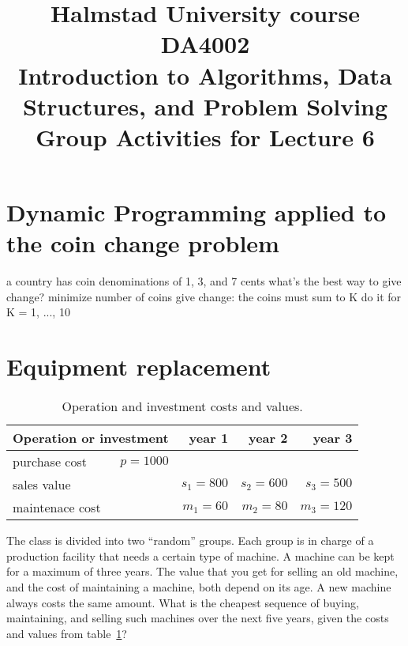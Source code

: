\documentclass[a4paper]{article}
\begin{document}
\title{
  {\small
    Halmstad University course DA4002\\
    Introduction to Algorithms, Data Structures, and Problem Solving\\
  }
  Group Activities for Lecture 6
}
\maketitle



\section{Dynamic Programming applied to the coin change problem}

a country has coin denominations of 1, 3, and 7 cents
what's the best way to give change?
minimize number of coins
give change: the coins must sum to K
do it for K = { 1, ..., 10 }



\section{Equipment replacement}

\begin{table}
  \caption{Operation and investment costs and values.}\label{tab:costs}
  \centering
  \begin{tabular}{lrrrr}
    \toprule
    \multicolumn{2}{l}{Operation or investment} & year 1    & year 2    & year 3    \\
    \midrule
    purchase cost                     & $p=1000$ &           &           &           \\
    sales value                       &          & $s_1=800$ & $s_2=600$ & $s_3=500$ \\
    maintenace cost                   &          & $m_1=60$  & $m_2=80$  & $m_3=120$ \\
    \bottomrule
  \end{tabular}
\end{table}

The class is divided into two ``random'' groups.
Each group is in charge of a production facility that needs a certain type of machine.
A machine can be kept for a maximum of three years.
The value that you get for selling an old machine, and the cost of maintaining a machine, both depend on its age.
A new machine always costs the same amount.
What is the cheapest sequence of buying, maintaining, and selling such machines over the next five years, given the costs and values from table~\ref{tab:costs}?
\end{document}
